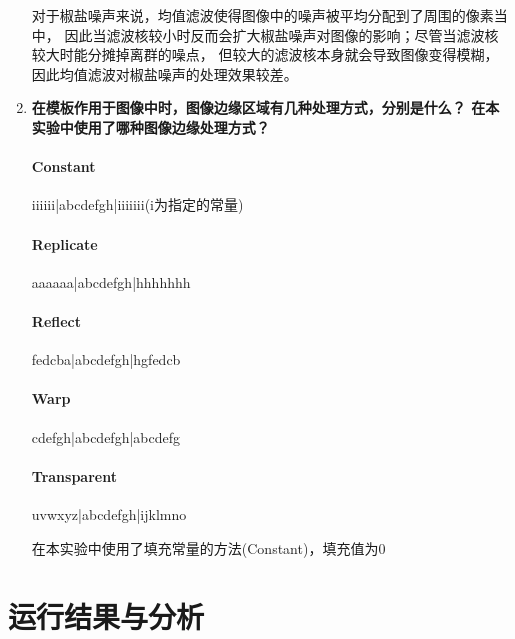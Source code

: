 \documentclass[a4paper]{ctexart}
\begin{document}
\begin{enumerate}
    对于椒盐噪声来说，均值滤波使得图像中的噪声被平均分配到了周围的像素当中，
    因此当滤波核较小时反而会扩大椒盐噪声对图像的影响；尽管当滤波核较大时能分摊掉离群的噪点，
    但较大的滤波核本身就会导致图像变得模糊，因此均值滤波对椒盐噪声的处理效果较差。
    \item \textbf{在模板作用于图像中时，图像边缘区域有几种处理方式，分别是什么？
    在本实验中使用了哪种图像边缘处理方式？}
    \paragraph*{Constant} iiiiii|abcdefgh|iiiiiii(i为指定的常量)
    \paragraph*{Replicate} aaaaaa|abcdefgh|hhhhhhh
    \paragraph*{Reflect} fedcba|abcdefgh|hgfedcb
    \paragraph*{Warp} cdefgh|abcdefgh|abcdefg
    \paragraph*{Transparent} uvwxyz|abcdefgh|ijklmno

    在本实验中使用了填充常量的方法(Constant)，填充值为0
  \end{enumerate}

  \newpage
  \section{运行结果与分析}
\end{document}
